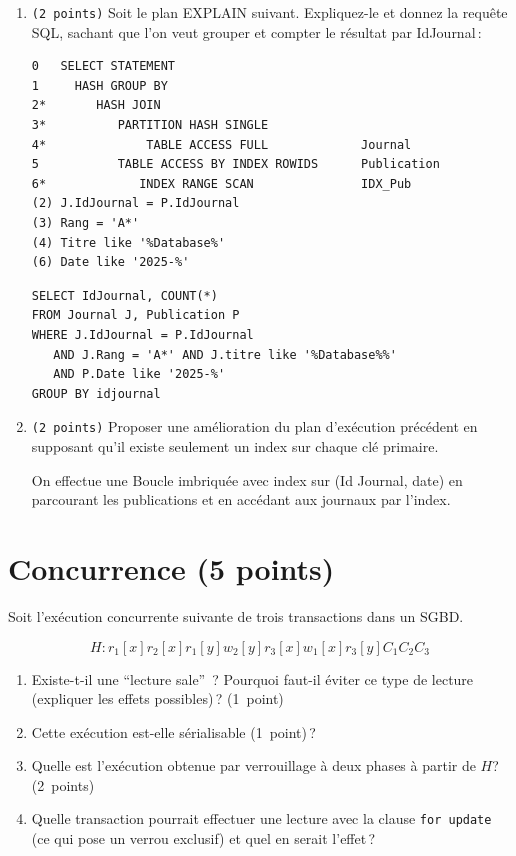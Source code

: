 \begin{enumerate}
	\item \texttt{(2~points)} Soit le plan EXPLAIN suivant.
  Expliquez-le et donnez la requête SQL, sachant que l'on veut grouper et compter le résultat par IdJournal\,:
\begin{verbatim}
0   SELECT STATEMENT
1     HASH GROUP BY
2*       HASH JOIN
3*          PARTITION HASH SINGLE
4*              TABLE ACCESS FULL             Journal
5           TABLE ACCESS BY INDEX ROWIDS      Publication
6*             INDEX RANGE SCAN               IDX_Pub
(2) J.IdJournal = P.IdJournal
(3) Rang = 'A*'
(4) Titre like '%Database%'
(6) Date like '2025-%'
\end{verbatim}

\begin{solution}
\begin{verbatim}
SELECT IdJournal, COUNT(*)
FROM Journal J, Publication P
WHERE J.IdJournal = P.IdJournal
   AND J.Rang = 'A*' AND J.titre like '%Database%%'
   AND P.Date like '2025-%'
GROUP BY idjournal
\end{verbatim}
\end{solution}

	\item \texttt{(2~points)} Proposer une amélioration
  du plan d'exécution précédent en supposant qu'il existe seulement un index
  sur chaque clé primaire.
\begin{solution}
On effectue une  Boucle imbriquée avec index  sur (Id Journal, date)
en parcourant les publications et en accédant aux journaux
par l'index.
\end{solution}
\end{enumerate}


\section{Concurrence (5 points)}

Soit l'ex\'ecution concurrente suivante de trois transactions dans un SGBD.

$$H: r_1[x] r_2[x] r_1[y] w_2[y] r_3[x] w_1[x] r_3[y] C_1 C_2 C_3$$

\begin{enumerate}
   \item Existe-t-il une ``lecture sale''~? Pourquoi faut-il \'eviter
   ce type de lecture (expliquer les effets possibles)\,? (1~point)

    \item Cette exécution est-elle sérialisable (1~point)\,?

     \item Quelle est l'ex\'ecution obtenue par verrouillage \`a deux phases
   \`a partir de $H$?  (2~points)

   \item Quelle transaction pourrait effectuer une lecture avec la clause
     \texttt{for update} (ce qui pose un verrou exclusif) 
	 et quel en serait l'effet\,?
\end{enumerate}

